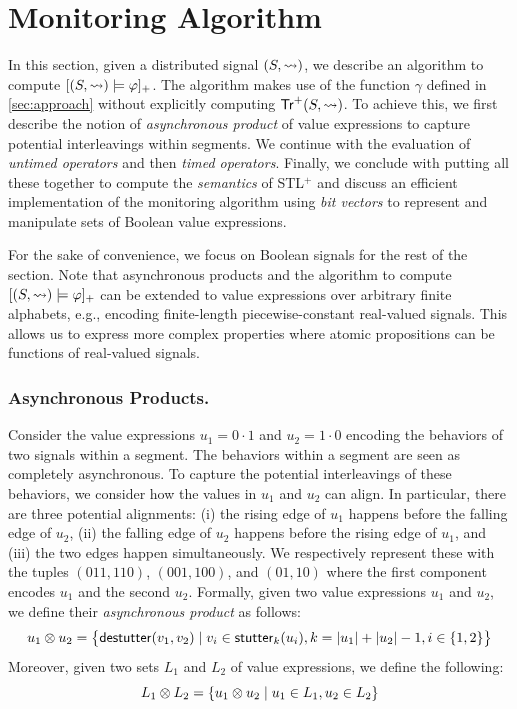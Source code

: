 \section{Monitoring Algorithm} \label{sec:algorithm}
In this section, given a distributed signal $(S,{\rightsquigarrow})$, we describe an algorithm to compute $[(S,{\rightsquigarrow}) \models \varphi]_+$.
The algorithm makes use of the function $\gamma$ defined in \cref{sec:approach} without explicitly computing $\mathsf{Tr}^+(S,{\rightsquigarrow})$.
To achieve this, we first describe the notion of \emph{asynchronous product} of value expressions to capture potential interleavings within segments.
We continue with the evaluation of \emph{untimed operators} and then \emph{timed operators}.
Finally, we conclude with putting all these together to compute the \emph{semantics} of STL$^+$ 
and discuss an efficient implementation of the monitoring algorithm using \emph{bit vectors} to 
represent and manipulate sets of Boolean value expressions.

\begin{remark}
	For the sake of convenience, we focus on Boolean signals for the rest of the section.
	Note that asynchronous products and the algorithm to compute $[(S,{\rightsquigarrow}) \models \varphi]_+$ can be extended to value expressions over arbitrary finite alphabets, e.g., encoding finite-length piecewise-constant real-valued signals.
	This allows us to express more complex properties where atomic propositions can be functions of real-valued signals.
\end{remark}

\subsubsection{Asynchronous Products.}
Consider the value expressions $u_1 = 0 \cdot 1$ and $u_2 = 1 \cdot 0$ encoding the behaviors of two signals within a segment.
The behaviors within a segment are seen as completely asynchronous.
To capture the potential interleavings of these behaviors, we consider how the values in $u_1$ and $u_2$ can align.
In particular, there are three potential alignments:
(i) the rising edge of $u_1$ happens before the falling edge of $u_2$,
(ii) the falling edge of $u_2$ happens before the rising edge of $u_1$, and
(iii) the two edges happen simultaneously.
We respectively represent these with the tuples $(011, 110)$, $(001, 100)$, and $(01, 10)$ where the first component encodes $u_1$ and the second $u_2$.
Formally, given two value expressions $u_1$ and $u_2$, we define their \emph{asynchronous product} as follows:
%
\small
\[ u_1 \otimes u_2 = \big\{ \destutter(v_1, v_2) \st v_i \in \stutter_k(u_i), k = |u_1| + |u_2| - 1, i \in 
\{1,2\} \big\} \]  
\normalsize
Moreover, given two sets $L_1$ and $L_2$ of value expressions, we define the following: 
\small
\[ L_1 \otimes L_2 = \{ u_1 \otimes u_2 \st u_1 \in L_1, u_2 \in L_2 \} \]  
\normalsize

